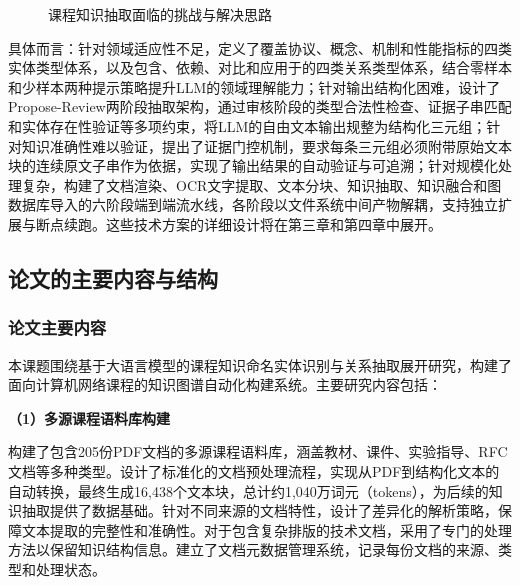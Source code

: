 \begin{figure}[ht]
    \caption{课程知识抽取面临的挑战与解决思路}\label{fig:1-1}
\end{figure}

具体而言：针对领域适应性不足，定义了覆盖协议、概念、机制和性能指标的四类实体类型体系，以及包含、依赖、对比和应用于的四类关系类型体系，结合零样本和少样本两种提示策略提升LLM的领域理解能力；针对输出结构化困难，设计了Propose-Review两阶段抽取架构，通过审核阶段的类型合法性检查、证据子串匹配和实体存在性验证等多项约束，将LLM的自由文本输出规整为结构化三元组；针对知识准确性难以验证，提出了证据门控机制，要求每条三元组必须附带原始文本块的连续原文子串作为依据，实现了输出结果的自动验证与可追溯；针对规模化处理复杂，构建了文档渲染、OCR文字提取、文本分块、知识抽取、知识融合和图数据库导入的六阶段端到端流水线，各阶段以文件系统中间产物解耦，支持独立扩展与断点续跑。这些技术方案的详细设计将在第三章和第四章中展开。

\subsection{论文的主要内容与结构}

\subsubsection{论文主要内容}

本课题围绕基于大语言模型的课程知识命名实体识别与关系抽取展开研究，构建了面向计算机网络课程的知识图谱自动化构建系统。主要研究内容包括：

\textbf{（1）多源课程语料库构建}

构建了包含205份PDF文档的多源课程语料库，涵盖教材、课件、实验指导、RFC文档等多种类型。设计了标准化的文档预处理流程，实现从PDF到结构化文本的自动转换，最终生成16,438个文本块，总计约1,040万词元（tokens），为后续的知识抽取提供了数据基础。针对不同来源的文档特性，设计了差异化的解析策略，保障文本提取的完整性和准确性。对于包含复杂排版的技术文档，采用了专门的处理方法以保留知识结构信息。建立了文档元数据管理系统，记录每份文档的来源、类型和处理状态。


